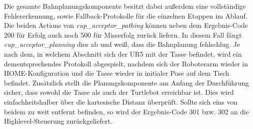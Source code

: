 \newline
Die gesamte Bahnplanungskomponente besitzt dabei außerdem eine vollständige Fehlererkennung, sowie Fallback-Protokolle für die einzelnen Etappen im Ablauf. Die beiden Actions von \textit{cup_acceptor_pathing} können neben dem Ergebnis-Code 200 für Erfolg auch noch 500 für Misserfolg zurück liefern. In diesem Fall fängt \textit{cup_acceptor_planning} dies ab und weiß, dass die Bahnplanung fehlschlug. Je nach dem, in welchem Abschnitt sich der UR5 mit der Tasse befindet, wird ein dementsprechendes Protokoll abgespielt, nachdem sich der Roboterarm wieder in HOME-Konfiguration und die Tasse wieder in initialer Pose auf dem Tisch befindet. Zusätzlich stellt die Planungskomponente am Anfang der Durchführung sicher, dass sowohl die Tasse als auch der Turtlebot erreichbar ist. Dies wird einfachheitshalber über die kartesische Distanz überprüft. Sollte sich eins von beidem zu weit entfernt befinden, so wird der Ergebnis-Code 301 bzw. 302 an die Highlevel-Steuerung zurückgeliefert.
